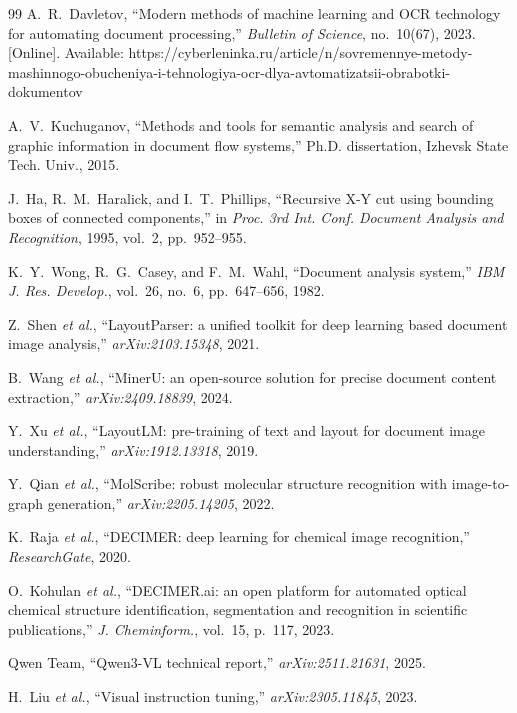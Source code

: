 \documentclass[conference]{IEEEtran}
\begin{document}
\begin{thebibliography}{99}
 A.~R.~Davletov, ``Modern methods of machine learning and OCR technology for automating document processing,'' \textit{Bulletin of Science}, no.~10(67), 2023. [Online]. Available: https://cyberleninka.ru/article/n/sovremennye-metody-mashinnogo-obucheniya-i-tehnologiya-ocr-dlya-avtomatizatsii-obrabotki-dokumentov

 A.~V.~Kuchuganov, ``Methods and tools for semantic analysis and search of graphic information in document flow systems,'' Ph.D. dissertation, Izhevsk State Tech. Univ., 2015.

 J.~Ha, R.~M.~Haralick, and I.~T.~Phillips, ``Recursive X-Y cut using bounding boxes of connected components,'' in \textit{Proc. 3rd Int. Conf. Document Analysis and Recognition}, 1995, vol.~2, pp.~952--955.

 K.~Y.~Wong, R.~G.~Casey, and F.~M.~Wahl, ``Document analysis system,'' \textit{IBM J. Res. Develop.}, vol.~26, no.~6, pp.~647--656, 1982.

 Z.~Shen \textit{et al.}, ``LayoutParser: a unified toolkit for deep learning based document image analysis,'' \textit{arXiv:2103.15348}, 2021.

 B.~Wang \textit{et al.}, ``MinerU: an open-source solution for precise document content extraction,'' \textit{arXiv:2409.18839}, 2024.

 Y.~Xu \textit{et al.}, ``LayoutLM: pre-training of text and layout for document image understanding,'' \textit{arXiv:1912.13318}, 2019.

 Y.~Qian \textit{et al.}, ``MolScribe: robust molecular structure recognition with image-to-graph generation,'' \textit{arXiv:2205.14205}, 2022.

 K.~Raja \textit{et al.}, ``DECIMER: deep learning for chemical image recognition,'' \textit{ResearchGate}, 2020.

 O.~Kohulan \textit{et al.}, ``DECIMER.ai: an open platform for automated optical chemical structure identification, segmentation and recognition in scientific publications,'' \textit{J. Cheminform.}, vol.~15, p.~117, 2023.

 Qwen Team, ``Qwen3-VL technical report,'' \textit{arXiv:2511.21631}, 2025.

 H.~Liu \textit{et al.}, ``Visual instruction tuning,'' \textit{arXiv:2305.11845}, 2023.


\end{thebibliography}
\end{document}
